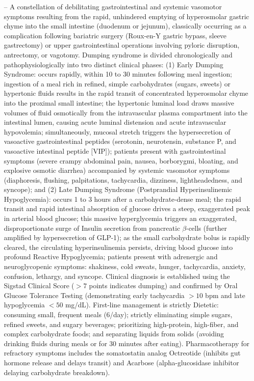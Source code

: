 -- A constellation of debilitating gastrointestinal and systemic vasomotor symptoms resulting from the rapid, unhindered emptying of hyperosmolar gastric chyme into the small intestine (duodenum or jejunum), classically occurring as a complication following bariatric surgery (Roux-en-Y gastric bypass, sleeve gastrectomy) or upper gastrointestinal operations involving pyloric disruption, antrectomy, or vagotomy. Dumping syndrome is divided chronologically and pathophysiologically into two distinct clinical phases: (1) Early Dumping Syndrome: occurs rapidly, within 10 to 30 minutes following meal ingestion; ingestion of a meal rich in refined, simple carbohydrates (sugars, sweets) or hypertonic fluids results in the rapid transit of concentrated hyperosmolar chyme into the proximal small intestine; the hypertonic luminal load draws massive volumes of fluid osmotically from the intravascular plasma compartment into the intestinal lumen, causing acute luminal distension and acute intravascular hypovolemia; simultaneously, mucosal stretch triggers the hypersecretion of vasoactive gastrointestinal peptides (serotonin, neurotensin, substance P, and vasoactive intestinal peptide [VIP]); patients present with gastrointestinal symptoms (severe crampy abdominal pain, nausea, borborygmi, bloating, and explosive osmotic diarrhea) accompanied by systemic vasomotor symptoms (diaphoresis, flushing, palpitations, tachycardia, dizziness, lightheadedness, and syncope); and (2) Late Dumping Syndrome (Postprandial Hyperinsulinemic Hypoglycemia): occurs 1 to 3 hours after a carbohydrate-dense meal; the rapid transit and rapid intestinal absorption of glucose drives a steep, exaggerated peak in arterial blood glucose; this massive hyperglycemia triggers an exaggerated, disproportionate surge of Insulin secretion from pancreatic $\beta$-cells (further amplified by hypersecretion of GLP-1); as the small carbohydrate bolus is rapidly cleared, the circulating hyperinsulinemia persists, driving blood glucose into profound Reactive Hypoglycemia; patients present with adrenergic and neuroglycopenic symptoms: shakiness, cold sweats, hunger, tachycardia, anxiety, confusion, lethargy, and syncope. Clinical diagnosis is established using the Sigstad Clinical Score ($>7$ points indicates dumping) and confirmed by Oral Glucose Tolerance Testing (demonstrating early tachycardia $>10$ bpm and late hypoglycemia $<50$ mg/dL). First-line management is strictly Dietetic: consuming small, frequent meals (6/day); strictly eliminating simple sugars, refined sweets, and sugary beverages; prioritizing high-protein, high-fiber, and complex carbohydrate foods; and separating liquids from solids (avoiding drinking fluids during meals or for 30 minutes after eating). Pharmacotherapy for refractory symptoms includes the somatostatin analog Octreotide (inhibits gut hormone release and delays transit) and Acarbose (alpha-glucosidase inhibitor delaying carbohydrate breakdown).

